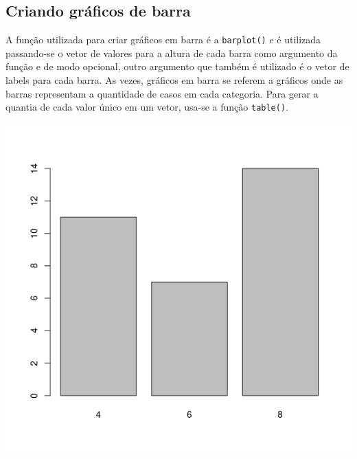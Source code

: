 \documentclass[
]{book}
\newenvironment{Shaded}{\begin{snugshade}}{\end{snugshade}}
\newcommand{\CommentTok}[1]{\textcolor[rgb]{0.56,0.35,0.01}{\textit{#1}}}
\newcommand{\DocumentationTok}[1]{\textcolor[rgb]{0.56,0.35,0.01}{\textbf{\textit{#1}}}}
\newcommand{\FunctionTok}[1]{\textcolor[rgb]{0.00,0.00,0.00}{#1}}
\newcommand{\NormalTok}[1]{#1}
\newcommand{\SpecialCharTok}[1]{\textcolor[rgb]{0.00,0.00,0.00}{#1}}
\begin{document}
\hypertarget{criando-gruxe1ficos-de-barra}{%
\subsection{Criando gráficos de barra}\label{criando-gruxe1ficos-de-barra}}

A função utilizada para criar gráficos em barra é a \texttt{barplot()} e é utilizada passando-se o vetor de valores para a altura de cada barra como argumento da função e de modo opcional, outro argumento que também é utilizado é o vetor de labels para cada barra. As vezes, gráficos em barra se referem a gráficos onde as barras representam a quantidade de casos em cada categoria. Para gerar a quantia de cada valor único em um vetor, usa-se a função \texttt{table()}.

\begin{Shaded}
\end{Shaded}

\begin{Shaded}
\end{Shaded}

\includegraphics{figure/g6.png}
\end{document}
